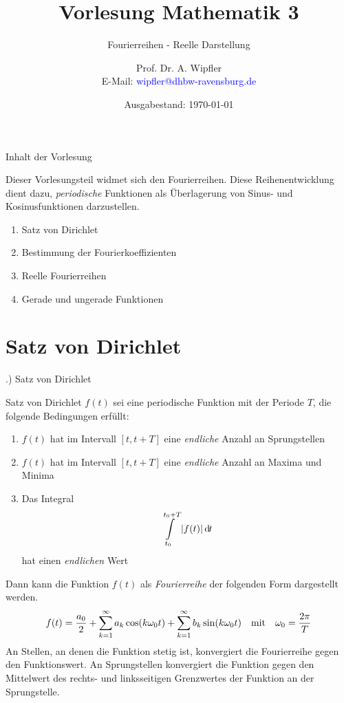 \documentclass[t,14pt]{beamer}
\title[]{Vorlesung Mathematik 3}
\subtitle{Fourierreihen - Reelle Darstellung}
\author[]{Prof. Dr. A. Wipfler\\ E-Mail: \textcolor{blue}{wipfler@dhbw-ravensburg.de}}
\institute[]{{\footnotesize Duale Hochschule Baden-W\"urttemberg, Ravensburg/Friedrichshafen}}
\date[]{Ausgabestand: \today}
\newcommand*\diff{\mathop{}\!\mathrm{d\hspace{-1pt}}}	%
\newcommand{\mitm}{\quad\textnormal{mit}\quad}
\begin{document}
\begin{frame}
\titlepage
\end{frame}





\begin{frame}{Inhalt der Vorlesung}

Dieser Vorlesungsteil widmet sich den Fourierreihen. Diese Reihenentwicklung dient dazu, \emph{periodische} Funktionen als Überlagerung von Sinus- 
und Kosinusfunktionen darzustellen.
\begin{enumerate}
\item Satz von Dirichlet
\item Bestimmung der Fourierkoeffizienten
\item Reelle Fourierreihen
\item Gerade und ungerade Funktionen
\end{enumerate}

\end{frame}

\section{Satz von Dirichlet}
\begin{frame}{\thesection .) Satz von Dirichlet}
\begin{alertblock}{Satz von Dirichlet}
$f(t)$ sei eine periodische Funktion mit der Periode $T$, die folgende Bedingungen erfüllt:
\begin{enumerate}
\item $f(t)$ hat im Intervall $[t,t+T]$ eine \emph{endliche} Anzahl an Sprungstellen
\item $f(t)$ hat im Intervall $[t,t+T]$ eine \emph{endliche} Anzahl an Maxima und Minima
\item Das Integral
\[
\intl_{t_0}^{t_0+T}|f(t)|\diff t 
\]
hat einen \emph{endlichen} Wert
\end{enumerate}
Dann kann die Funktion $f(t)$ als \emph{Fourierreihe} der folgenden Form dargestellt werden.
\[
f(t)=\frac{a_0}{2}+\suml_{k=1}^{\infty}a_k\cos(k\omega_0 t)+\suml_{k=1}^{\infty}b_k\sin(k\omega_0 t) \mitm \omega_0=\frac{2\pi}{T}
\]
An Stellen, an denen die Funktion stetig ist, konvergiert die Fourierreihe gegen den Funktionswert. An Sprungstellen konvergiert die Funktion 
gegen den Mittelwert des rechts- und linksseitigen Grenzwertes der Funktion an der Sprungstelle.
\end{alertblock}
\end{frame}
\end{document}
